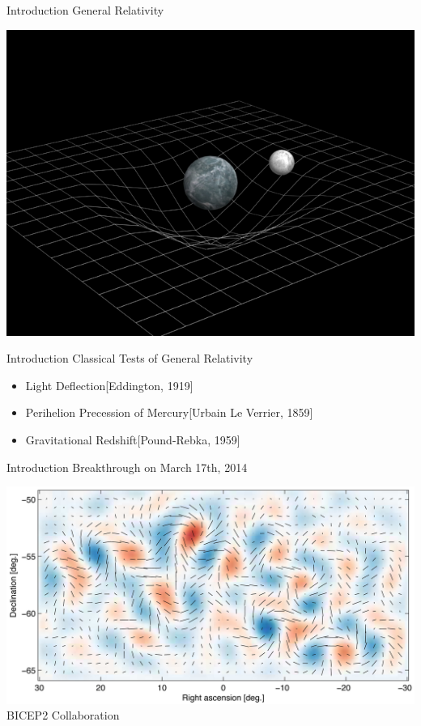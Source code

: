 \documentclass[xcolor=dvipsnames]{beamer}
\begin{document}
	\begin{frame}{Introduction}
		General Relativity
		\begin{center}
			\includegraphics[scale=0.4]{curvature.jpg}
		\end{center}
	\end{frame}
	\begin{frame}{Introduction}
		Classical Tests of General Relativity
		\begin{itemize}
			\item{Light Deflection[Eddington, 1919]}
			\item{Perihelion Precession of Mercury[Urbain Le Verrier, 1859]}
			\item{Gravitational Redshift[Pound-Rebka, 1959]}
		\end{itemize}
	\end{frame}
	\begin{frame}{Introduction}
		Breakthrough on March 17th, 2014
		\pause
		\begin{center}
			\includegraphics[scale=0.6]{bicep2-hires.jpg}\\
			\tiny{BICEP2 Collaboration}
		\end{center}
	\end{frame}
\end{document}
